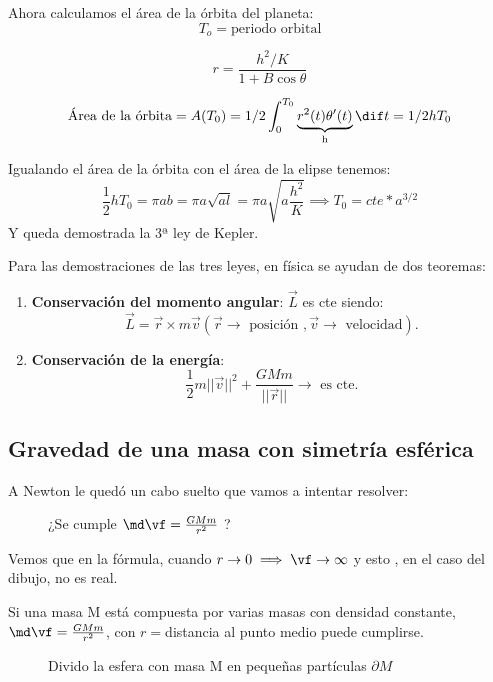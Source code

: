 Ahora calculamos el área de la órbita del planeta:
$$T_o = \text{periodo orbital}$$

$$r= \frac{h^2/K}{1 + B\cos\theta}$$

$$\text{Área de la órbita} = A(T_0) = 1/2 \int_0^{T_0} \underbrace{r^2(t)\theta'(t)}_{\text{h}}\dif t = 1/2hT_0$$

Igualando el área de la órbita con  el área de la elipse tenemos:
$$\frac{1}{2}hT_0 = \pi ab= \pi a \sqrt{al} = \pi a\sqrt{a\frac{h^2}{K}} \implies T_0 = cte*a^{3/2}$$
Y queda demostrada la 3ª ley de Kepler.

\obs Para las demostraciones de las tres leyes, en física se ayudan de dos teoremas:
\begin{enumerate}
\item\textbf{Conservación del momento angular}:
$\overrightarrow{L}$ es cte siendo:
\[\overrightarrow{L} = \overrightarrow{r} \times m \overrightarrow{v} (\overrightarrow{r} \rightarrow  \text{ posición },  \overrightarrow{v} \rightarrow \text{ velocidad}).\]


\item\textbf{Conservación de la energía}:\\
\[\frac{1}{2}m||\overrightarrow{v}||^2 + \frac{GMm}{||\overrightarrow{r}||} \rightarrow \text{ es cte}.\]
\end{enumerate}

\subsection{Gravedad de una masa con simetría esférica}
A Newton le quedó un cabo suelto que vamos a intentar resolver:

\begin{figure}[hbtp]
	\centering
	\caption{¿Se cumple $\md\vf = \frac{GMm}{r^2}$ ?}
\end{figure}
Vemos que en la fórmula, cuando $r \rightarrow 0 \implies \vf \rightarrow \infty$ y esto , en el caso del dibujo, no es real.

Si una masa M está compuesta por varias masas con densidad constante, $\md\vf = \frac{GMm}{r^2}$, con $r =$distancia al punto medio puede cumplirse.

\begin{figure}[hbtp]
\centering
{}
\caption{Divido la esfera con masa M en pequeñas partículas $\partial M$}
\label{figaaa}
\end{figure}

